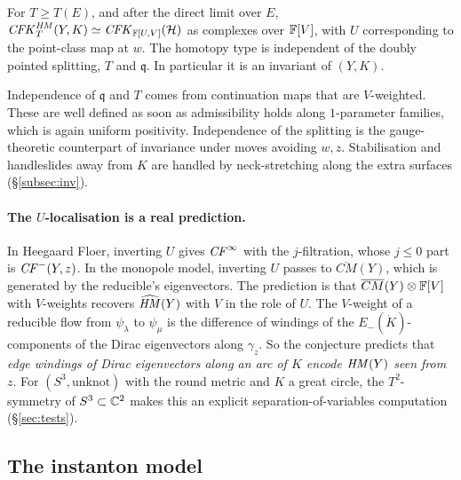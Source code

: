 \begin{conjecture}\label{conj:MAF}
For $T\ge T(E)$, and after the direct limit over $E$, $\mathit{CFK}^{\mathit{HM}}_T(Y,K)\simeq\mathit{CFK}_{\mathbb{F}[U,V]}(\mathcal H)$ as complexes over $\mathbb{F}[V]$,
with $U$ corresponding to the point-class map at $w$.  The homotopy type is independent of the doubly pointed splitting,
$T$ and $\mathfrak q$.  In particular it is an invariant of $(Y,K)$.
\end{conjecture}
Independence of $\mathfrak q$ and $T$ comes from continuation maps that are $V$-weighted.  These are well defined as soon
as admissibility holds along $1$-parameter families, which is again uniform positivity.  Independence of the splitting
is the gauge-theoretic counterpart of invariance under moves avoiding $w,z$.  Stabilisation and handleslides away from
$K$ are handled by neck-stretching along the extra surfaces (\S\ref{subsec:inv}).

\paragraph{The $U$-localisation is a real prediction.}
In Heegaard Floer, inverting $U$ gives $\mathit{CF}^\infty$ with the $j$-filtration, whose $j\le0$ part is $\mathit{CF}^-(Y,z)$.
In the monopole model, inverting $U$ passes to $\overline{CM}(Y)$, which is generated by the reducible's eigenvectors.
The prediction is that $\overline{CM}(Y)\otimes\mathbb{F}[V]$ with $V$-weights recovers $\widehat{\mathit{HM}}(Y)$ with $V$ in the role of $U$.  The
$V$-weight of a reducible flow from $\psi_\lambda$ to $\psi_\mu$ is the difference of windings of the $E_-(\dot K)$-components of the
Dirac eigenvectors along $\gamma_z$.  So the conjecture predicts that \emph{edge windings of Dirac eigenvectors along an arc
of $K$ encode $\mathit{HM}(Y)$ seen from $z$}.  For $(S^3,\text{unknot})$ with the round metric and $K$ a great circle, the
$T^2$-symmetry of $S^3\subset\mathbb{C}^2$ makes this an explicit separation-of-variables computation (\S\ref{sec:tests}).

\subsection{The instanton model}\label{subsec:instanton}
